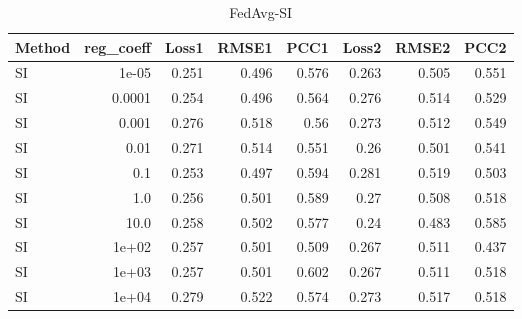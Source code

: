 \begin{table}
\caption{FedAvg-SI}
\begin{tabular}{lrrrrrrr}
\toprule
Method & reg_coeff & Loss1 & RMSE1 & PCC1 & Loss2 & RMSE2 & PCC2 \\
\midrule
SI & 1e-05 & 0.251 & 0.496 & 0.576 & 0.263 & 0.505 & 0.551 \\
SI & 0.0001 & 0.254 & 0.496 & 0.564 & 0.276 & 0.514 & 0.529 \\
SI & 0.001 & 0.276 & 0.518 & 0.56 & 0.273 & 0.512 & 0.549 \\
SI & 0.01 & 0.271 & 0.514 & 0.551 & 0.26 & 0.501 & 0.541 \\
SI & 0.1 & 0.253 & 0.497 & 0.594 & 0.281 & 0.519 & 0.503 \\
SI & 1.0 & 0.256 & 0.501 & 0.589 & 0.27 & 0.508 & 0.518 \\
SI & 10.0 & 0.258 & 0.502 & 0.577 & 0.24 & 0.483 & 0.585 \\
SI & 1e+02 & 0.257 & 0.501 & 0.509 & 0.267 & 0.511 & 0.437 \\
SI & 1e+03 & 0.257 & 0.501 & 0.602 & 0.267 & 0.511 & 0.518 \\
SI & 1e+04 & 0.279 & 0.522 & 0.574 & 0.273 & 0.517 & 0.518 \\
\bottomrule
\end{tabular}
\end{table}
